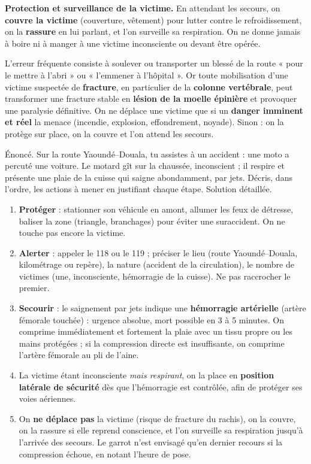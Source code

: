\documentclass[11pt]{article}
\newcounter{popsec}
\newcounter{popsub}
\newcommand{\courssub}[1]{%
  \stepcounter{popsub}%
  \par\vspace{9pt}\noindent{\popxbold\fontsize{11.5}{13}\selectfont\color{popink}{\color{poporange}\thepopsec.\thepopsub}\hspace{6pt}#1}\par\nopagebreak\vspace{4pt}
}
\begin{document}
\textbf{Protection et surveillance de la victime.} En attendant les secours, on \textbf{couvre la victime} (couverture, vêtement) pour lutter contre le refroidissement, on la \textbf{rassure} en lui parlant, et l'on surveille sa respiration. On ne donne jamais à boire ni à manger à une victime inconsciente ou devant être opérée.

\begin{attention}
L'erreur fréquente consiste à soulever ou transporter un blessé de la route « pour le mettre à l'abri » ou « l'emmener à l'hôpital ». Or toute mobilisation d'une victime suspectée de \textbf{fracture}, en particulier de la \textbf{colonne vertébrale}, peut transformer une fracture stable en \textbf{lésion de la moelle épinière} et provoquer une paralysie définitive. On ne déplace une victime que si un \textbf{danger imminent et réel} la menace (incendie, explosion, effondrement, noyade). Sinon : on la protège sur place, on la couvre et l'on attend les secours.
\end{attention}

\courssub{Exercice résolu et importance de la formation}

\begin{exoresolu}
Énoncé. Sur la route Yaoundé--Douala, tu assistes à un accident : une moto a percuté une voiture. Le motard gît sur la chaussée, inconscient ; il respire et présente une plaie de la cuisse qui saigne abondamment, par jets. Décris, dans l'ordre, les actions à mener en justifiant chaque étape.
\tcblower
Solution détaillée.
\begin{enumerate}
\item \textbf{Protéger} : stationner son véhicule en amont, allumer les feux de détresse, baliser la zone (triangle, branchages) pour éviter une suraccident. On ne touche pas encore la victime.
\item \textbf{Alerter} : appeler le 118 ou le 119 ; préciser le lieu (route Yaoundé--Douala, kilométrage ou repère), la nature (accident de la circulation), le nombre de victimes (une, inconsciente, hémorragie de la cuisse). Ne pas raccrocher le premier.
\item \textbf{Secourir} : le saignement par jets indique une \textbf{hémorragie artérielle} (artère fémorale touchée) : urgence absolue, mort possible en 3 à 5 minutes. On comprime immédiatement et fortement la plaie avec un tissu propre ou les mains protégées ; si la compression directe est insuffisante, on comprime l'artère fémorale au pli de l'aine.
\item La victime étant inconsciente \emph{mais respirant}, on la place en \textbf{position latérale de sécurité} dès que l'hémorragie est contrôlée, afin de protéger ses voies aériennes.
\item On \textbf{ne déplace pas} la victime (risque de fracture du rachis), on la couvre, on la rassure si elle reprend conscience, et l'on surveille sa respiration jusqu'à l'arrivée des secours. Le garrot n'est envisagé qu'en dernier recours si la compression échoue, en notant l'heure de pose.
\end{enumerate}
\end{exoresolu}
\end{document}
